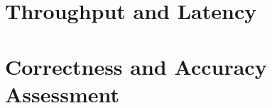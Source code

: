 \section{Throughput and Latency}
\label{sec:throughput}
%

\section{Correctness and Accuracy Assessment}
\label{sec:correctness}

